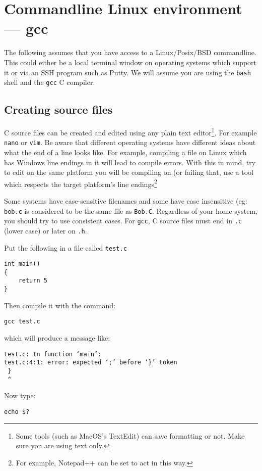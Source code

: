 
\chapter{Commandline Linux environment --- gcc}

The following assumes that you have access to a Linux/Posix/BSD commandline.
This could either be a local terminal window on operating systems which support it or via an SSH program such as Putty.
We will assume you are using the \texttt{bash} shell and the \texttt{gcc} C compiler.

\section{Creating source files}
C source files can be created and edited using any plain text editor\footnote{Some tools (such as MacOS's TextEdit) can save formatting or not. Make sure you are using text only.}.
For example \texttt{nano} or \texttt{vim}.
Be aware that different operating systems have different ideas about what the end of a line looks like.
For example, compiling a file on Linux which has Windows line endings in it will lead to compile errors.
With this in mind, try to edit on the same platform you will be compiling on (or failing that, use a tool which respects the target
platform's line endings\footnote{For example, Notepad++ can be set to act in this way.}

Some systems have case-sensitive filenames and some have case insensitive (eg: \texttt{bob.c} is considered to be the same file as \texttt{Bob.C}.
Regardless of your home system, you should try to use consistent cases.
For \texttt{gcc}, C source files must end in \texttt{.c} (lower case) or later on \texttt{.h}.

Put the following in a file called \texttt{test.c}
\begin{lstlisting}
int main()
{
    return 5
}
\end{lstlisting}

Then compile it with the command:
\begin{verbatim}
gcc test.c 
\end{verbatim}
which will produce a message like:
\begin{verbatim}
test.c: In function ‘main’:
test.c:4:1: error: expected ‘;’ before ‘}’ token
 }
 ^
\end{verbatim}

Now type:
\begin{verbatim}
echo $? 
\end{verbatim}

